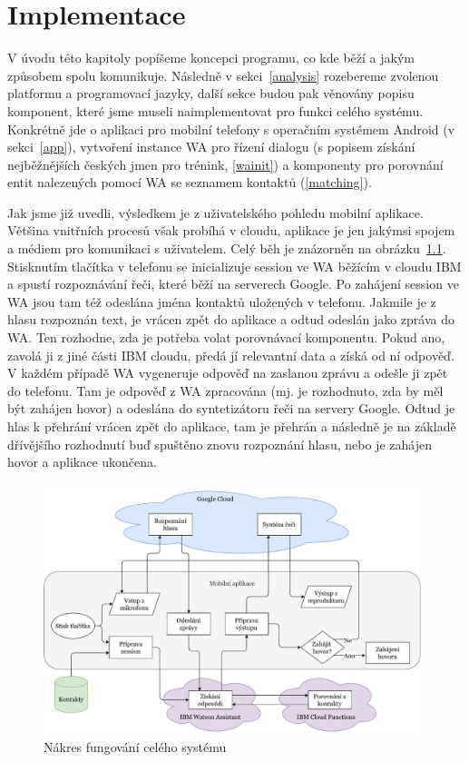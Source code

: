 \chapter{Implementace}

V úvodu této kapitoly popíšeme koncepci programu, co kde
běží a jakým způsobem spolu komunikuje. Následně v sekci~\ref{analysis}
rozebereme zvolenou platformu a programovací jazyky,
další sekce budou pak věnovány popisu komponent, které jsme museli
naimplementovat pro funkci celého systému. Konkrétně jde o aplikaci pro
mobilní telefony s operačním systémem Android (v sekci~\ref{app}), vytvoření instance WA pro řízení
dialogu (s popisem získání nejběžnějších českých jmen pro trénink, \ref{wainit}) a komponenty
pro porovnání entit nalezených pomocí WA se seznamem kontaktů (\ref{matching}).

Jak jsme již uvedli, výsledkem je z uživatelského pohledu mobilní
aplikace. Většina vnitřních procesů však probíhá v cloudu, aplikace
je jen jakýmsi spojem a médiem pro komunikaci s uživatelem. Celý běh
je znázorněn na obrázku~\ref{img-flowchart}. Stisknutím tlačítka v
telefonu se
inicializuje session ve WA běžícím v cloudu IBM a spustí rozpoznávání řeči,
které běží na serverech Google. Po zahájení session ve WA jsou tam též
odeslána jména kontaktů uložených v telefonu. Jakmile je z hlasu rozpoznán
text, je vrácen zpět do aplikace a odtud odeslán jako zpráva do WA.
Ten rozhodne, zda je potřeba volat
porovnávací komponentu. Pokud ano, zavolá ji z jiné části IBM cloudu,
předá jí relevantní data a získá od ní odpověď. V každém případě
WA vygeneruje odpověď na zaslanou zprávu a odešle ji zpět do telefonu.
Tam je odpověď z WA zpracována (mj. je rozhodnuto, zda by měl být
zahájen hovor) a odeslána do syntetizátoru řeči na servery Google.
Odtud je hlas k přehrání vrácen zpět do aplikace, tam je přehrán
a následně je na základě dřívějšího rozhodnutí buď spuštěno znovu
rozpoznání hlasu, nebo je zahájen hovor a aplikace ukončena.


\begin{figure}[h]\label{img-flowchart}
    \centering
    \includegraphics[width=0.98\textwidth]{../img/app-flowchart.pdf}
    \caption{Nákres fungování celého systému}
\end{figure}

